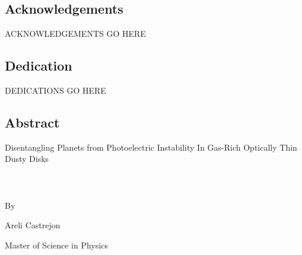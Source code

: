 \documentclass[onecolumn]{report}
\begin{document}
\begin{center}
\newpage
\section*{\normalfont Acknowledgements}
\thispagestyle{plain}
\end{center}

ACKNOWLEDGEMENTS GO HERE


\newpage
\begin{center}
\section*{\normalfont Dedication}
\thispagestyle{plain}
\end{center}

DEDICATIONS GO HERE

\newpage
\singlespacing

\tableofcontents

\clearpage
{}
\listoffigures

\clearpage
\begin{center}
\section*{Abstract}
\thispagestyle{plain}

\doublespacing
\large

Disentangling Planets from Photoelectric Instability In Gas-Rich Optically Thin Dusty Disks  \\~\\~\\~\\

By

Areli Castrejon

Master of Science in Physics \\~\\~\\~\\

\end{center}

\doublespacing
\large
\end{document}
